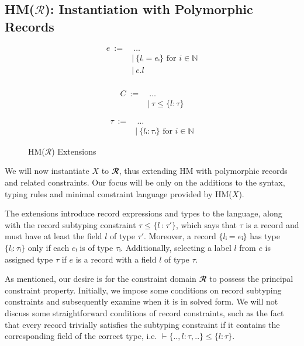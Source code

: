 \documentclass[runningheads]{llncs}
\newcommand{\hmx}{HM($X$)}
\newcommand{\hmr}{HM($\mathcal{R}$)}
\begin{document}
\subsection{\hmr{}: Instantiation with Polymorphic Records}
\begin{figure}[t]
  \begin{subfigure}[t]{0.3\textwidth}
    \begin{align*}
      e \ := & \ \dots                            \\
             & | \ \{lᵢ = eᵢ\} \text{ for } i ∈ ℕ \\
             & | \ e.l                            \\
    \end{align*}
  \end{subfigure}
  \begin{subfigure}[t]{0.3\textwidth}
    \begin{align*}
      C \ := & \ \dots           \\
             & | \ τ ≤ \{l : τ\}
    \end{align*}
  \end{subfigure}
  \begin{subfigure}[t]{0.3\textwidth}
    \begin{align*}
      τ \ := & \ \dots                            \\
             & | \ \{lᵢ : τᵢ\} \text{ for } i ∈ ℕ
    \end{align*}
  \end{subfigure}
  \centering
  \caption{\hmr{} Extensions}
\end{figure}
We will now instantiate $X$ to $𝓡$, thus extending HM with
polymorphic records and related constraints. Our focus will be only on the
additions to the syntax, typing rules and minimal constraint language provided
by \hmx{}.

The extensions introduce record expressions and types to the language, along
with the
record subtyping constraint $τ ≤ \{l ∶ τ'\}$, which says that $τ$ is a record
and
must have at least the field $l$ of type $τ'$.
Moreover, a record $\{lᵢ = eᵢ\}$ has type $\{lᵢ : τᵢ\}$ only if each
$eᵢ$ is of type $τᵢ$. Additionally, selecting a label $l$ from $e$ is assigned
type $τ$ if $e$ is a record with a field $l$ of type $τ$.

As mentioned, our desire is for the constraint domain $𝓡$ to possess the
principal constraint property. Initially, we impose some conditions on record
subtyping constraints and subsequently examine when it is in solved form. We
will not discuss some straightforward conditions of record constraints, such as
the fact that every record trivially satisfies the subtyping constraint if it
contains the corresponding field of the correct type, i.e.
$⊢ \{.., l:τ, ..\} ≤ \{l : τ\}$.
\end{document}
